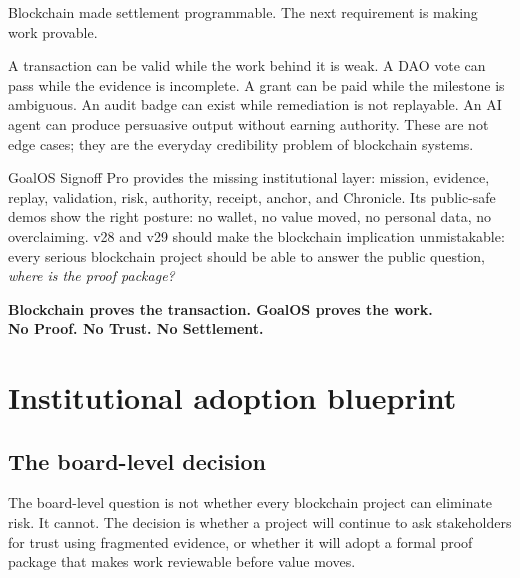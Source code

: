 \documentclass[11pt]{article}
\begin{document}
Blockchain made settlement programmable. The next requirement is making work provable.

A transaction can be valid while the work behind it is weak. A DAO vote can pass while the evidence is incomplete. A grant can be paid while the milestone is ambiguous. An audit badge can exist while remediation is not replayable. An AI agent can produce persuasive output without earning authority. These are not edge cases; they are the everyday credibility problem of blockchain systems.

GoalOS Signoff Pro provides the missing institutional layer: mission, evidence, replay, validation, risk, authority, receipt, anchor, and Chronicle. Its public-safe demos show the right posture: no wallet, no value moved, no personal data, no overclaiming. v28 and v29 should make the blockchain implication unmistakable: every serious blockchain project should be able to answer the public question, \emph{where is the proof package?}

\begin{standardbox}
\begin{center}
{\Large\bfseries Blockchain proves the transaction. GoalOS proves the work.}\\[4pt]
{\Large\bfseries No Proof. No Trust. No Settlement.}
\end{center}
\end{standardbox}

\newpage
\appendix


\section{Institutional adoption blueprint}

\subsection{The board-level decision}

The board-level question is not whether every blockchain project can eliminate risk. It cannot. The decision is whether a project will continue to ask stakeholders for trust using fragmented evidence, or whether it will adopt a formal proof package that makes work reviewable before value moves.
\end{document}
